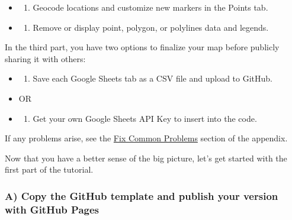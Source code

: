 \documentclass[
  english,
]{book}
\providecommand{\tightlist}{%
  \setlength{\itemsep}{0pt}\setlength{\parskip}{0pt}}
\begin{document}
\begin{itemize}
\item
  \begin{enumerate}
  \def\labelenumi{\Alph{enumi})}
  \setcounter{enumi}{4}
  \tightlist
  \item
    Geocode locations and customize new markers in the Points tab.
  \end{enumerate}
\item
  \begin{enumerate}
  \def\labelenumi{\Alph{enumi})}
  \setcounter{enumi}{5}
  \tightlist
  \item
    Remove or display point, polygon, or polylines data and legends.
  \end{enumerate}
\end{itemize}

In the third part, you have two options to finalize your map before publicly sharing it with others:

\begin{itemize}
\item
  \begin{enumerate}
  \def\labelenumi{\Alph{enumi})}
  \setcounter{enumi}{6}
  \tightlist
  \item
    Save each Google Sheets tab as a CSV file and upload to GitHub.
  \end{enumerate}
\item
  OR
\item
  \begin{enumerate}
  \def\labelenumi{\Alph{enumi})}
  \setcounter{enumi}{7}
  \tightlist
  \item
    Get your own Google Sheets API Key to insert into the code.
  \end{enumerate}
\end{itemize}

If any problems arise, see the \href{fix.html}{Fix Common Problems} section of the appendix.

Now that you have a better sense of the big picture, let's get started with the first part of the tutorial.

\hypertarget{a-copy-the-github-template-and-publish-your-version-with-github-pages}{%
\subsubsection*{A) Copy the GitHub template and publish your version with GitHub Pages}\label{a-copy-the-github-template-and-publish-your-version-with-github-pages}}
\end{document}
